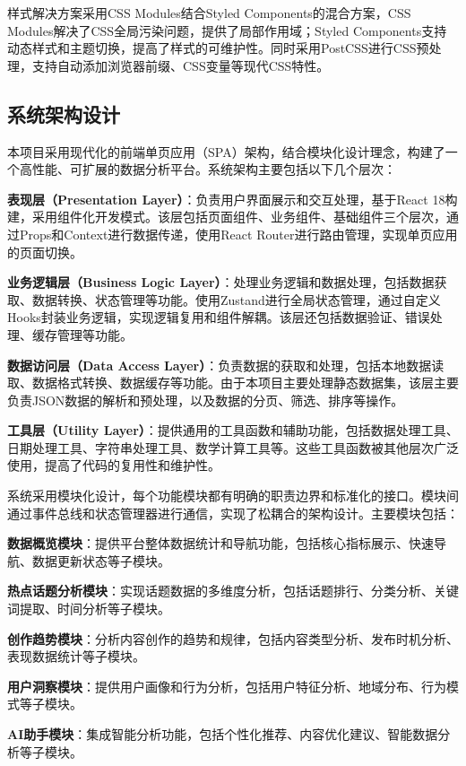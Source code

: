 \documentclass[12pt,a4paper]{article}
\begin{document}
样式解决方案采用CSS Modules结合Styled Components的混合方案，CSS Modules解决了CSS全局污染问题，提供了局部作用域；Styled Components支持动态样式和主题切换，提高了样式的可维护性。同时采用PostCSS进行CSS预处理，支持自动添加浏览器前缀、CSS变量等现代CSS特性。

\subsection{系统架构设计}

本项目采用现代化的前端单页应用（SPA）架构，结合模块化设计理念，构建了一个高性能、可扩展的数据分析平台。系统架构主要包括以下几个层次：

\textbf{表现层（Presentation Layer）}：负责用户界面展示和交互处理，基于React 18构建，采用组件化开发模式。该层包括页面组件、业务组件、基础组件三个层次，通过Props和Context进行数据传递，使用React Router进行路由管理，实现单页应用的页面切换。

\textbf{业务逻辑层（Business Logic Layer）}：处理业务逻辑和数据处理，包括数据获取、数据转换、状态管理等功能。使用Zustand进行全局状态管理，通过自定义Hooks封装业务逻辑，实现逻辑复用和组件解耦。该层还包括数据验证、错误处理、缓存管理等功能。

\textbf{数据访问层（Data Access Layer）}：负责数据的获取和处理，包括本地数据读取、数据格式转换、数据缓存等功能。由于本项目主要处理静态数据集，该层主要负责JSON数据的解析和预处理，以及数据的分页、筛选、排序等操作。

\textbf{工具层（Utility Layer）}：提供通用的工具函数和辅助功能，包括数据处理工具、日期处理工具、字符串处理工具、数学计算工具等。这些工具函数被其他层次广泛使用，提高了代码的复用性和维护性。

系统采用模块化设计，每个功能模块都有明确的职责边界和标准化的接口。模块间通过事件总线和状态管理器进行通信，实现了松耦合的架构设计。主要模块包括：

\textbf{数据概览模块}：提供平台整体数据统计和导航功能，包括核心指标展示、快速导航、数据更新状态等子模块。

\textbf{热点话题分析模块}：实现话题数据的多维度分析，包括话题排行、分类分析、关键词提取、时间分析等子模块。

\textbf{创作趋势模块}：分析内容创作的趋势和规律，包括内容类型分析、发布时机分析、表现数据统计等子模块。

\textbf{用户洞察模块}：提供用户画像和行为分析，包括用户特征分析、地域分布、行为模式等子模块。

\textbf{AI助手模块}：集成智能分析功能，包括个性化推荐、内容优化建议、智能数据分析等子模块。
\end{document}
